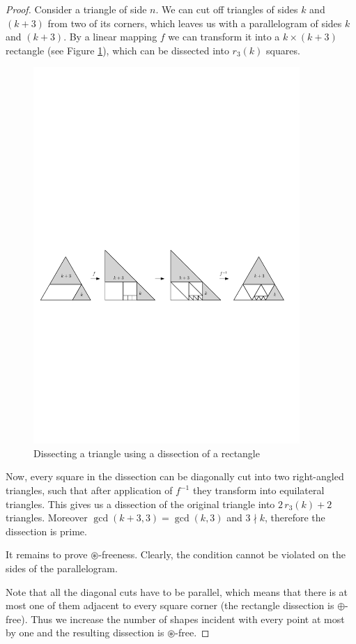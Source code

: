 \begin{proof}
Consider a triangle of side $n$. We can cut off triangles of sides $k$ and $(k+3)$ from two of its corners, which leaves us with a parallelogram of sides $k$ and $(k+3)$. By a linear mapping $f$ we can transform it into a $k\times (k+3)$ rectangle (see Figure \ref{fig:transf}), which can be dissected into $r_3(k)$ squares.

\begin{figure}[htb]
\centering
\includegraphics[width=0.9\textwidth]{img/transf.pdf}
\caption{Dissecting a triangle using a dissection of a rectangle}
\label{fig:transf}
\end{figure}

Now, every square in the dissection can be diagonally cut into two right-angled triangles, such that after application of $f^{-1}$ they transform into equilateral triangles. This gives us a dissection of the original triangle into $2\,r_3(k)+2$ triangles. Moreover $\gcd(k+3,3) =\gcd (k,3)$ and $3 \nmid k$, therefore the dissection is prime.

It remains to prove $\circledast$-freeness. Clearly, the condition cannot be violated on the sides of the parallelogram.

Note that all the diagonal cuts have to be parallel, which means that there is at most one of them adjacent to every square corner (the rectangle dissection is $\oplus$-free). Thus we increase the number of shapes incident with every point at most by one and the resulting dissection is $\circledast$-free.
\end{proof}


